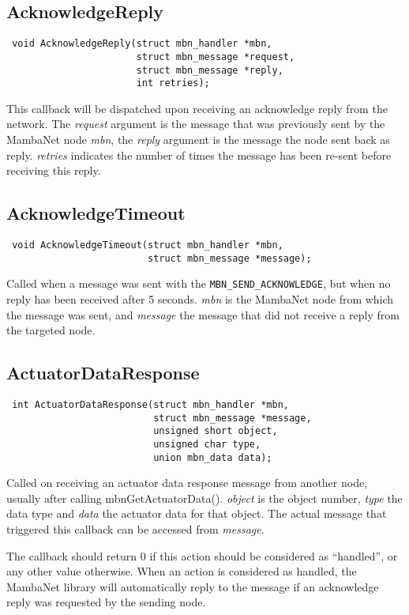 \documentclass[a4paper]{report}
\begin{document}
\subsection{AcknowledgeReply}
\begin{verbatim}
 void AcknowledgeReply(struct mbn_handler *mbn,
                       struct mbn_message *request,
                       struct mbn_message *reply,
                       int retries);
\end{verbatim}
This callback will be dispatched upon receiving an acknowledge reply from the network. The \textit{request} argument is the message that was previously sent by the MambaNet node \textit{mbn}, the \textit{reply} argument is the message the node sent back as reply. \textit{retries} indicates the number of times the message has been re-sent before receiving this reply.


\subsection{AcknowledgeTimeout}
\begin{verbatim}
 void AcknowledgeTimeout(struct mbn_handler *mbn,
                         struct mbn_message *message);
\end{verbatim}
Called when a message was sent with the \verb|MBN_SEND_ACKNOWLEDGE|, but when no reply has been received after 5 seconds. \textit{mbn} is the MambaNet node from which the message was sent, and \textit{message} the message that did not receive a reply from the targeted node.


\subsection{ActuatorDataResponse}
\begin{verbatim}
 int ActuatorDataResponse(struct mbn_handler *mbn,
                          struct mbn_message *message,
                          unsigned short object,
                          unsigned char type,
                          union mbn_data data);
\end{verbatim}
Called on receiving an actuator data response message from another node, usually after calling mbnGetActuatorData(). \textit{object} is the object number, \textit{type} the data type and \textit{data} the actuator data for that object. The actual message that triggered this callback can be accessed from \textit{message}.

The callback should return 0 if this action should be considered as ``handled'', or any other value otherwise. When an action is considered as handled, the MambaNet library will automatically reply to the message if an acknowledge reply was requested by the sending node.
\end{document}
